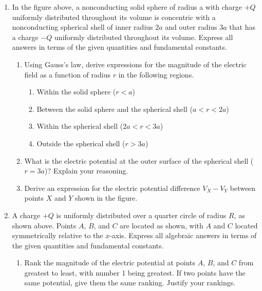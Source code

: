 \documentclass{../../../oss-apphys}
\begin{document}
\begin{enumerate}
\item In the figure above, a nonconducting solid sphere of radius a with charge
  $+Q$ uniformly distributed throughout its volume is concentric with a
  nonconducting spherical shell of inner radius $2a$ and outer radius $3a$ that
  has a charge $-Q$ uniformly distributed throughout its volume. Express all
  answers in terms of the given quantities and fundamental constants.
  \begin{enumerate}
  \item Using Gauss's law, derive expressions for the magnitude of the
    electric field as a function of radius $r$ in the following regions.
    \begin{enumerate}
    \item Within the solid sphere ($r<a$)
    \item Between the solid sphere and the spherical shell ($a<r<2a$)
    \item Within the spherical shell ($2a<r<3a$)
    \item Outside the spherical shell ($r>3a$)
    \end{enumerate}
  \item What is the electric potential at the outer surface of the spherical
    shell ($r=3a$)? Explain your reasoning.
  \item Derive an expression for the electric potential difference $V_X-V_Y$
    between points $X$ and $Y$ shown in the figure.
  \end{enumerate}
  \newpage

\item A charge $+Q$ is uniformly distributed over a quarter circle of radius
  $R$, as shown above. Points $A$, $B$, and $C$ are located as shown, with $A$
  and $C$ located symmetrically relative to the $x$-axis. Express all algebraic
  answers in terms of the given quantities and fundamental constants.
  \begin{enumerate}
  \item Rank the magnitude of the electric potential at points $A$, $B$, and $C$
    from greatest to least, with number 1 being greatest. If two points have
    the same potential, give them the same ranking. Justify your rankings.


\end{enumerate}
\end{enumerate}
\end{document}
